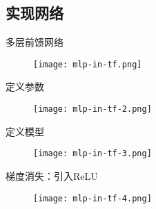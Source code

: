\subsection{实现网络}

\begin{frame}[fragile]{多层前馈网络}
  \begin{figure}
    \centering
    \texttt{[image: mlp-in-tf.png]}
  \end{figure}
\end{frame}

\begin{frame}[fragile]{定义参数}
  \begin{figure}
    \centering
    \texttt{[image: mlp-in-tf-2.png]}
  \end{figure}
\end{frame}

\begin{frame}[fragile]{定义模型}
  \begin{figure}
    \centering
    \texttt{[image: mlp-in-tf-3.png]}
  \end{figure}
\end{frame}

\begin{frame}[fragile]{梯度消失：引入ReLU}
  \begin{figure}
    \centering
    \texttt{[image: mlp-in-tf-4.png]}
  \end{figure}
\end{frame}

